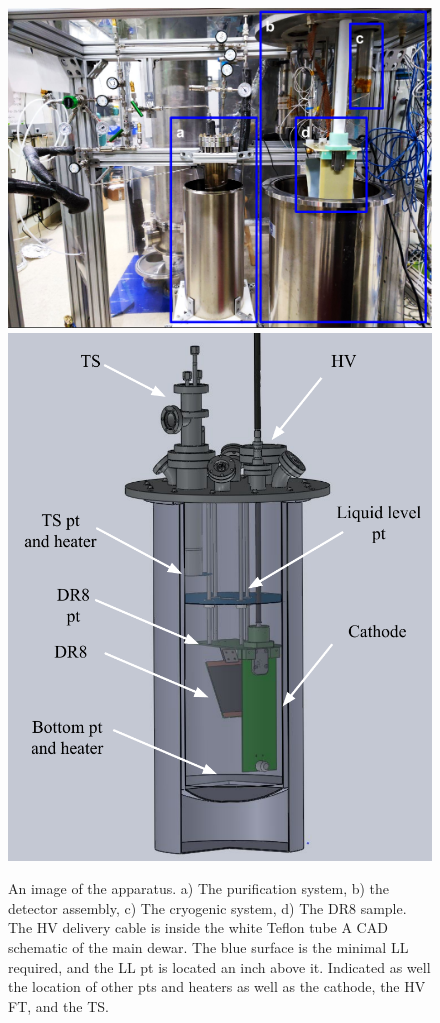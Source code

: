 \documentclass[a4paper,12pt]{article}
\newcommand{\DR}{DR8}
\begin{document}
\begin{figure}[ht]
	{\includegraphics[width=0.85\linewidth]{full_sys.png}}
	{\includegraphics[width=0.75\linewidth]{Dewar.png}}
	\caption{An image of the apparatus. a) The purification system, b) the detector assembly, c) The cryogenic system, d) The {\DR} sample. The HV delivery cable is inside the white Teflon tube
	A CAD schematic of the main dewar. The blue surface is the minimal LL required, and the LL pt is located an inch above it. Indicated as well the location of other pts and heaters as well as the cathode, the HV FT, and the TS.}
	\label{fig:full_sys}
\end{figure}
\end{document}
